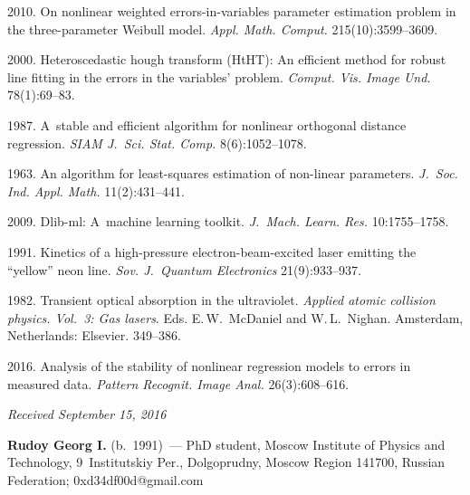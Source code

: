 \begin{multicols}{2}
{{\begin{thebibliography}{99}
 2010.
On nonlinear weighted errors-in-variables
  parameter estimation problem in the three-parameter Weibull model.
\textit{Appl. Math. Comput.} 215(10):3599--3609.

 2000.
Heteroscedastic hough transform (HtHT): An
  efficient method for robust line fitting in the errors in the
  variables' problem.
\textit{Comput. Vis. Image Und.} 78(1):69--83.

  1987. A~stable and efficient algorithm for nonlinear orthogonal distance regression.
\textit{SIAM J.~Sci. Stat.  Comp.} 8(6):1052--1078.

 1963. An algorithm for
  least-squares estimation of non-linear parameters.
\textit{J.~Soc. Ind. Appl.  Math.} 11(2):431--441.

 2009. Dlib-ml: A~machine
  learning toolkit.
\textit{J.~Mach. Learn. Res.} 10:1755--1758.

 1991.
Kinetics of a high-pressure electron-beam-excited laser emitting the ``yellow'' 
neon line. \textit{Sov. J.~Quantum Electronics} 21(9):933--937.

 1982. {Transient optical absorption 
in the ultraviolet}. \textit{Applied atomic collision physics. Vol.~3: Gas lasers}.
Eds. E.\,W.~McDaniel and W.\,L.~Nighan. Amsterdam, Netherlands: Elsevier.
349--386.

 2016. Analysis of the
  stability of nonlinear regression models to errors in measured data.
\textit{Pattern Recognit. Image Anal.} 26(3):608--616.
\end{thebibliography}

 }
 }

\end{multicols}

\vspace*{-6pt}

\hfill{\small\textit{Received September 15, 2016}}

\vspace*{-18pt}

\Contrl

\noindent
\textbf{Rudoy Georg I.} (b.\ 1991)~--- PhD student,
Moscow Institute of Physics and Technology, 9~Institutskiy Per., Dolgoprudny,
Moscow Region 141700, Russian Federation;
\mbox{0xd34df00d@gmail.com}


\label{end\stat}


\renewcommand{\bibname}{\protect\rm Литература} 